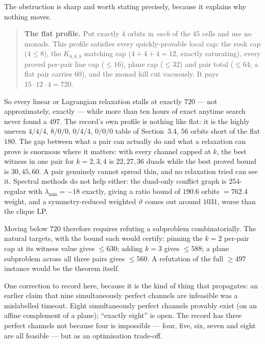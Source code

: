 \documentclass[10pt,a4paper]{article}
\begin{document}
The obstruction is sharp and worth stating precisely, because it explains why nothing moves.

\begin{quote}
\textbf{The flat profile.} Put exactly $4$ orbits in \emph{each} of the $45$ cells and use no
monads. This profile satisfies every quickly-provable local cap: the rook cap ($4 \le 8$), the
$K_{8,8,8}$ matching cap ($4+4+4 = 12$, exactly saturating), every proved per-pair line cap
($\le 16$), plane cap ($\le 32$) and pair total ($\le 64$; a flat pair carries $60$), and the monad
kill cut vacuously. It pays $15 \cdot 12 \cdot 4 = 720$.
\end{quote}

So every linear or Lagrangian relaxation stalls at exactly $720$ --- not approximately, exactly ---
while more than ten hours of exact anytime search never found a $497$. The record's own profile is
nothing like flat: it is the highly uneven $4/4/4$, $8/0/0$, $0/4/4$, $0/0/0$ table of Section~3.4,
$56$ orbits short of the flat $180$. The gap between what a pair can actually do and what a
relaxation can prove is enormous where it matters: with every channel capped at $k$, the best
witness in one pair for $k = 2,3,4$ is $22, 27, 36$ duads while the best proved bound is $30, 45,
60$. A pair genuinely cannot spread thin, and no relaxation tried can see it. Spectral methods do
not help either: the duad-only conflict graph is $254$-regular with $\lambda_{\min} = -18$ exactly,
giving a ratio bound of $190.6$ orbits $=762.4$ weight, and a symmetry-reduced weighted
$\vartheta$ comes out around $1031$, worse than the clique LP.

Moving below $720$ therefore requires refuting a subproblem combinatorially. The natural targets,
with the bound each would certify: pinning the $k=2$ per-pair cap at its witness value gives
$\le 630$; adding $k = 3$ gives $\le 588$; a plane subproblem across all three pairs gives
$\le 560$. A refutation of the full $\ge 497$ instance would be the theorem itself.

One correction to record here, because it is the kind of thing that propagates: an earlier claim
that nine simultaneously perfect channels are infeasible was a mislabelled timeout. Eight
simultaneously perfect channels provably exist (on an affine complement of a plane); ``exactly
eight'' is open. The record has three perfect channels not because four is impossible --- four,
five, six, seven and eight are all feasible --- but as an optimisation trade-off.
\end{document}
